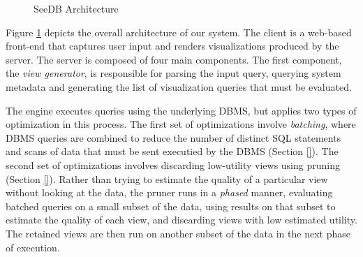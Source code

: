 \begin{figure}[htb]
\vspace{-10pt}
\centerline{
\hbox{}}
\vspace{-18pt}
\caption{SeeDB Architecture}
\label{fig:sys-arch}
\vspace{-12pt}
\end{figure} 

Figure \ref{fig:sys-arch} depicts the overall architecture of our
system.  The \SeeDB client is a web-based front-end that captures user
input and renders visualizations produced by the \SeeDB server.  The
\SeeDB server is composed of four main components.  The first
component, the {\it view generator}, is responsible for parsing the
input query, querying system metadata and generating the list of
visualization queries that must be evaluated.  


The engine executes
queries using the underlying DBMS, but applies two types of
optimization in this process.  The first set of optimizations involve
{\it batching}, where DBMS queries are combined to reduce the number
of distinct SQL statements and scans of data that must be sent
executied by the DBMS (Section \ref{}).  The second set of
optimizations involves discarding low-utility views using pruning
(Section \ref{}).  Rather than trying to estimate the quality of a
particular view without looking at the data, the pruner runs in a {\it
  phased} manner, evaluating batched queries on a small subset of the
data, using results on that subset to estimate the quality of each
view, and discarding views with low estimated utility.  The retained
views are then run on another subset of the data in the next phase of 
execution.


